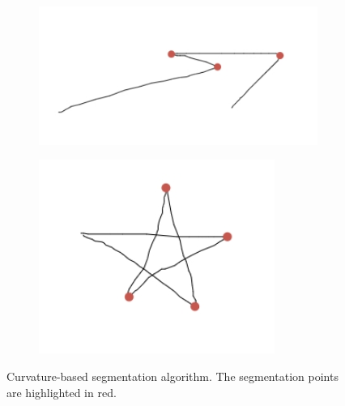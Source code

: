 \begin{figure}
	\centering
	\begin{subfigure}{0.45\textwidth}
		\centering
		\includegraphics[scale=0.5]{./img/seg_results_arrow.jpg}
		\caption{}
		\label{fig:seg_results_arrow}
	\end{subfigure}
	\begin{subfigure}{0.45\textwidth}
		\centering
		\includegraphics[scale=0.6]{./img/seg_results_pentagram.jpg}
		\caption{}
		\label{fig:seg_results_pentagram}
	\end{subfigure}
	\caption{Curvature-based segmentation algorithm. The segmentation points are highlighted in red.}
	\label{fig:seg_results}
\end{figure}

